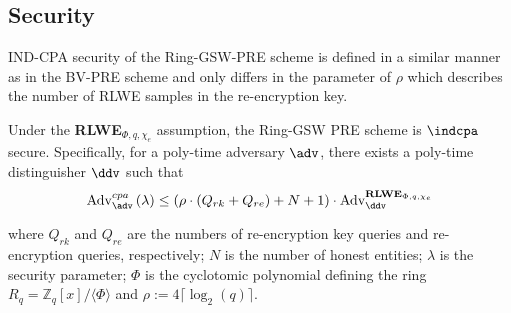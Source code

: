 \subsection{Security}

IND-CPA security of the Ring-GSW-PRE scheme is defined in a similar manner as in the BV-PRE scheme and only differs in the parameter of $\rho$ which describes the number of RLWE samples in the re-encryption key. 

\begin{theorem} Under the \textbf{RLWE}$_{\Phi,q,\chi_e}$ assumption, the Ring-GSW PRE scheme is $\indcpa$ secure. Specifically, for a poly-time adversary $\adv$, there exists a poly-time distinguisher
$\ddv$ such that
$$\text{Adv}^{cpa}_{\adv}\left(\lambda \right) \leq \left( \rho\cdot\left(Q_{rk}+Q_{re}\right)+ N + 1\right)\cdot\text{Adv}^{\mathbf{RLWE}_{\Phi,q,\chi_e}}_{\ddv}$$ 

\noindent where $Q_{rk}$ and $Q_{re}$ are the numbers of re-encryption key queries and re-encryption queries, respectively; $N$ is the number of honest entities; $\lambda$ is the security parameter; $\Phi$ is the cyclotomic polynomial defining the ring $R_q = \mathbb{Z}_q[x]/\langle\Phi \rangle$ and $\rho := 4\lceil \log_2 (q) \rceil$. 
\end{theorem}